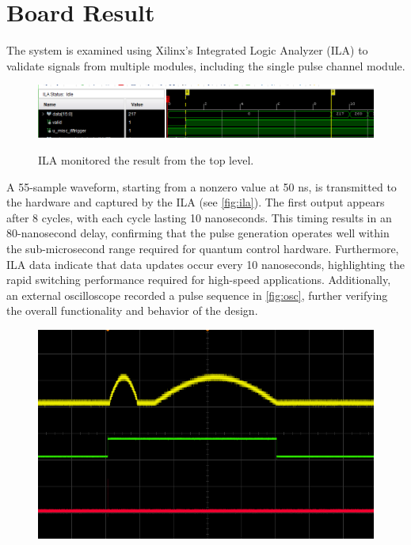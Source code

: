\section{Board Result}
The system is examined using Xilinx's Integrated Logic Analyzer (ILA) to validate signals from multiple modules, including the single pulse channel module.  
\begin{figure}[ht]
    \centering
    \includegraphics[width=1\linewidth]{figures/ila.png}
    \caption{ILA monitored the result from the top level.}
    \setlength{\abovecaptionskip}{5pt}    %
    \setlength{\belowcaptionskip}{5pt}    %
    \label{fig:ila}
\end{figure}

A 55-sample waveform, starting from a nonzero value at 50 ns, is transmitted to the hardware and captured by the ILA (see \autoref{fig:ila}). The first output appears after 8 cycles, with each cycle lasting 10 nanoseconds. This timing results in an 80-nanosecond delay, confirming that the pulse generation operates well within the sub-microsecond range required for quantum control hardware. Furthermore, ILA data indicate that data updates occur every 10 nanoseconds, highlighting the rapid switching performance required for high-speed applications. Additionally, an external oscilloscope recorded a pulse sequence in \autoref{fig:osc}, further verifying the overall functionality and behavior of the design.
\begin{figure}[ht]
    \centering
    \includegraphics[width=.7\linewidth]{figures/one_trig_seq.png}
    \caption{}
    \setlength{\abovecaptionskip}{5pt}    %
    \setlength{\belowcaptionskip}{5pt}    %
    \label{fig:osc}
\end{figure}

